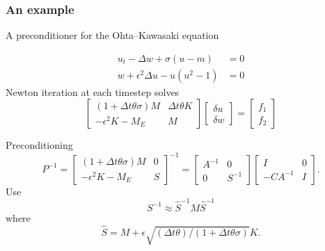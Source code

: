 \documentclass[presentation]{beamer}
\begin{document}
\begin{frame}[allowframebreaks]
  \frametitle{An example}
  A preconditioner for the Ohta--Kawasaki
  equation \parencite{Farrell:2016}

  \begin{equation*}
    \begin{split}
      u_t - \Delta w + \sigma(u - m) &= 0\\
      w + \epsilon^2 \Delta u - u(u^2 - 1) &= 0
    \end{split}
  \end{equation*}
  Newton iteration at each timestep solves
  \begin{equation*}
    \begin{bmatrix}
      (1 + \Delta t \theta \sigma)M  & \Delta t\theta K \\
      -\epsilon^2 K - M_E & M
    \end{bmatrix}
    \begin{bmatrix}
      \delta u \\
      \delta w
    \end{bmatrix} =
    \begin{bmatrix}
      f_1 \\
      f_2
    \end{bmatrix}
  \end{equation*}

  \pagebreak
  
  Preconditioning
  \begin{equation*}
    P^{-1} = 
    \begin{bmatrix}
      (1 + \Delta t \theta \sigma)M  & 0 \\
      -\epsilon^2 K - M_E & S
    \end{bmatrix}^{-1} =
    \begin{bmatrix}
      A^{-1}  & 0 \\
      0 & S^{-1}
    \end{bmatrix}
    \begin{bmatrix}
      I & 0 \\
      -C A^{-1}  & I
    \end{bmatrix}.
  \end{equation*}
  Use
  \begin{equation*}
    S^{-1} \approx \hat{S}^{-1}M\hat{S}^{-1}
  \end{equation*}
  where
  \begin{equation*}
    \hat{S} = M + \epsilon\sqrt{(\Delta t \theta)/(1+\Delta t \theta\sigma)} K.
  \end{equation*}
\end{frame}
\end{document}
